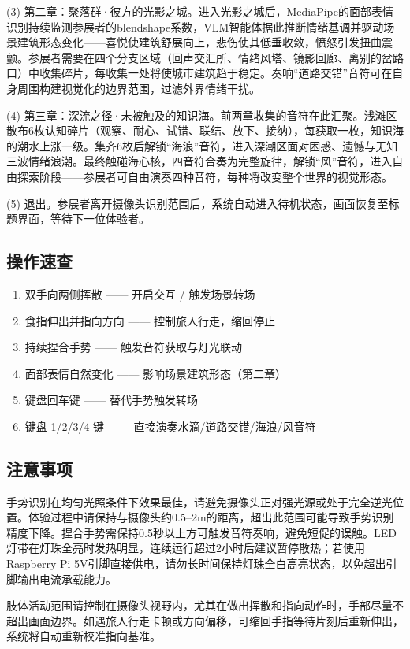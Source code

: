 \documentclass[bachelor]{njupthesis}
\begin{document}
(3) 第二章：聚落群·彼方的光影之城。进入光影之城后，MediaPipe的面部表情识别持续监测参展者的blendshape系数，VLM智能体据此推断情绪基调并驱动场景建筑形态变化——喜悦使建筑舒展向上，悲伤使其低垂收敛，愤怒引发扭曲震颤。参展者需要在四个分支区域（回声交汇所、情绪风塔、镜影回廊、离别的岔路口）中收集碎片，每收集一处将使城市建筑趋于稳定。奏响“道路交错”音符可在自身周围构建视觉化的边界范围，过滤外界情绪干扰。

(4) 第三章：深流之径·未被触及的知识海。前两章收集的音符在此汇聚。浅滩区散布6枚认知碎片（观察、耐心、试错、联结、放下、接纳），每获取一枚，知识海的潮水上涨一级。集齐6枚后解锁“海浪”音符，进入深潮区面对困惑、遗憾与无知三波情绪浪潮。最终触碰海心核，四音符合奏为完整旋律，解锁“风”音符，进入自由探索阶段——参展者可自由演奏四种音符，每种将改变整个世界的视觉形态。

(5) 退出。参展者离开摄像头识别范围后，系统自动进入待机状态，画面恢复至标题界面，等待下一位体验者。

\subsection{操作速查}

\begin{enumerate}
\item 双手向两侧挥散 —— 开启交互 / 触发场景转场
\item 食指伸出并指向方向 —— 控制旅人行走，缩回停止
\item 持续捏合手势 —— 触发音符获取与灯光联动
\item 面部表情自然变化 —— 影响场景建筑形态（第二章）
\item 键盘回车键 —— 替代手势触发转场
\item 键盘 1/2/3/4 键 —— 直接演奏水滴/道路交错/海浪/风音符
\end{enumerate}

\subsection{注意事项}

手势识别在均匀光照条件下效果最佳，请避免摄像头正对强光源或处于完全逆光位置。体验过程中请保持与摄像头约0.5--2m的距离，超出此范围可能导致手势识别精度下降。捏合手势需保持0.5秒以上方可触发音符奏响，避免短促的误触。LED灯带在灯珠全亮时发热明显，连续运行超过2小时后建议暂停散热；若使用Raspberry Pi 5V引脚直接供电，请勿长时间保持灯珠全白高亮状态，以免超出引脚输出电流承载能力。

肢体活动范围请控制在摄像头视野内，尤其在做出挥散和指向动作时，手部尽量不超出画面边界。如遇旅人行走卡顿或方向偏移，可缩回手指等待片刻后重新伸出，系统将自动重新校准指向基准。
\end{document}
